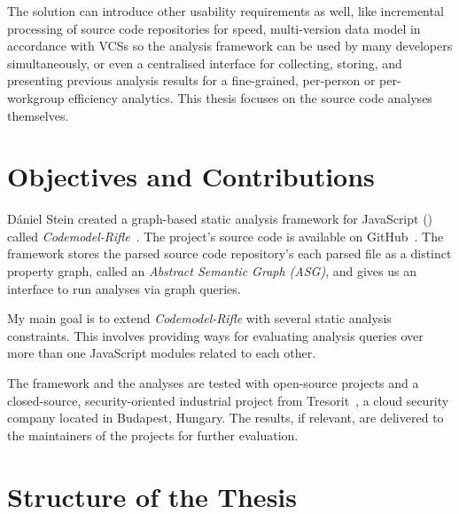 The solution can introduce other usability requirements as well, like incremental processing of source code repositories for speed, multi-version data model in accordance with VCSs so the analysis framework can be used by many developers simultaneously, or even a centralised interface for collecting, storing, and presenting previous analysis results for a fine-grained, per-person or per-workgroup efficiency analytics. This thesis focuses on the source code analyses themselves.


\section{Objectives and Contributions}

Dániel Stein created a graph-based static analysis framework for JavaScript (\es) called \emph{Codemodel-Rifle}~\cite{stein-daniel-msc}. The project's source code is available on GitHub~\cite{codemodel-rifle-github}. The framework stores the parsed source code repository's each parsed file as a distinct property graph, called an \emph{Abstract Semantic Graph (ASG)}, and gives us an interface to run analyses via graph queries.

My main goal is to extend \emph{Codemodel-Rifle} with several static analysis constraints. This involves providing ways for evaluating analysis queries over more than one JavaScript modules related to each other.

The framework and the analyses are tested with open-source projects and a closed-source, security-oriented industrial project from Tresorit~\cite{tresorit}, a cloud security company located in Budapest, Hungary. The results, if relevant, are delivered to the maintainers of the projects for further evaluation.


\section{Structure of the Thesis}

